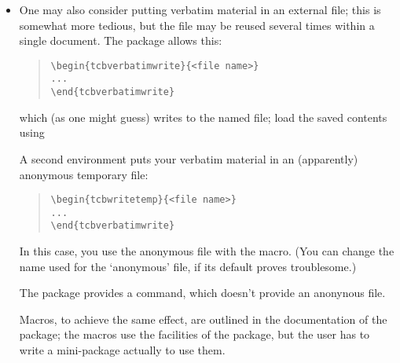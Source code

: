\begin{itemize}
  A robust alternative is:
\begin{quote}
\begin{verbatim}
\chardef\us=`\_
...
\section{... \texttt{my\us name}}
\end{verbatim}
\end{quote}
  Such a definition is `naturally' robust; the construction
  ``'' may be used for any
  troublesome character (though it's plainly not necessary for things
  like percent signs for which \AllTeX{} already provides
  robust macros).

\item One may also consider putting verbatim material in an external
  file; this is somewhat more tedious, but the file may be reused
  several times within a single document.  The 
  package allows this:
\begin{quote}
\begin{verbatim}
\begin{tcbverbatimwrite}{<file name>}
...
\end{tcbverbatimwrite}
\end{verbatim}
\end{quote}
  which (as one might guess) writes to the named file; load the saved
  contents using 

  A second environment puts your verbatim material in an (apparently)
  anonymous temporary file:
\begin{quote}
\begin{verbatim}
\begin{tcbwritetemp}{<file name>}
...
\end{tcbverbatimwrite}
\end{verbatim}
\end{quote}
  In this case, you use the anonymous file with the 
  macro.  (You can change the name used for the `anonymous' file, if
  its default proves troublesome.)

  The  package provides a 
  command, which doesn't provide an anonynous file.

  Macros, to achieve the same effect, are outlined in the
  documentation of the  package; the macros use the
  facilities of the package, but the user has to write a mini-package
  actually to use them.
\end{itemize}
